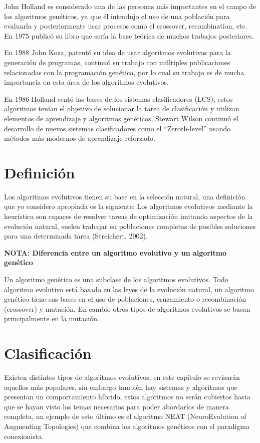 \documentclass[11pt,fleqn]{book} %
\begin{document}
John Holland es considerado una de las personas más importantes en el campo de los algoritmos genéticos, ya que él introdujo el uso de una población para evaluarla y posteriormente usar procesos como el crossover, recombination, etc. En 1975 publicó su libro que sería la base teórica de muchos trabajos posteriores.

En 1988 John Koza, patentó su idea de usar algoritmos evolutivos para la generación de programas, continuó su trabajo con múltiples publicaciones relacionadas con la programación genética, por lo cual su trabajo es de mucha importancia en esta área de los algoritmos evolutivos.

En 1986 Holland sentó las bases de los sistemas clasificadores (LCS), estos algoritmos tenían el objetivo de solucionar la tarea de clasificación y utilizan elementos de aprendizaje y algoritmos genéticos, Stewart Wilson continuó el desarrollo de nuevos sistemas clasificadores como el “Zeroth-level” usando métodos más modernos de aprendizaje reforzado.

\section{Definición} 

Los algoritmos evolutivos tienen su base en la selección natural, una definición que yo considero apropiada es la siguiente: Los algoritmos evolutivos mediante la heurística son capaces de resolver tareas de optimización imitando aspectos de la evolución natural, suelen trabajar en poblaciones completas de posibles soluciones para una determinada tarea (Streichert, 2002).

\textbf{NOTA: Diferencia entre un algoritmo evolutivo y un algoritmo genético}

Un algoritmo genético es una subclase de los algoritmos evolutivos.
Todo algoritmo evolutivo está basado en las leyes de la evolución natural, un algoritmo genético tiene sus bases en el uso de poblaciones, cruzamiento o recombinación (crossover) y mutación. En cambio otros tipos de algoritmos evolutivos se basan principalmente en la mutación.

\section{Clasificación} 

Existen distintos tipos de algoritmos evolutivos, en este capítulo se revisarán aquellos más populares, sin embargo también hay sistemas y algoritmos que presentan un comportamiento híbrido, estos algoritmos no serán cubiertos hasta que se hayan visto los temas necesarios para poder abordarlos de manera completa, un ejemplo de esto último es el algoritmo NEAT (NeuroEvolution of Augmenting Topologies) que combina los algoritmos genéticos con el paradigma conexionista.
\end{document}
